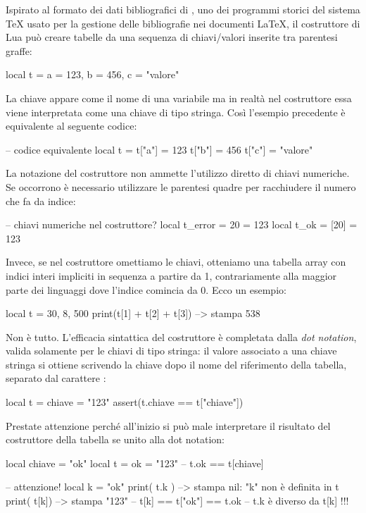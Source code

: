 Ispirato al formato dei dati bibliografici di \BibTeX, uno dei programmi storici
del sistema \TeX{} usato per la gestione delle bibliografie nei documenti
\LaTeX, il costruttore di Lua può creare tabelle da una sequenza di
chiavi/valori inserite tra parentesi graffe:
\begin{lines}
local t = { a = 123, b = 456, c = "valore" }
\end{lines}

La chiave appare come il nome di una variabile ma in realtà nel costruttore
essa viene interpretata come una chiave di tipo stringa. Così l'esempio
precedente è equivalente al seguente codice:
\begin{lines}
-- codice equivalente
local t = {}
t["a"] = 123
t["b"] = 456
t["c"] = "valore"
\end{lines}

La notazione del costruttore non ammette l'utilizzo diretto di chiavi
numeriche. Se occorrono è necessario utilizzare le parentesi quadre per
racchiudere il numero che fa da indice:
\begin{lines}
-- chiavi numeriche nel costruttore?
local t_error = { 20 = 123 }
local t_ok = { [20] = 123 }
\end{lines}

Invece, se nel costruttore omettiamo le chiavi, otteniamo una tabella array con
indici interi impliciti in sequenza a partire da 1, contrariamente alla maggior
parte dei linguaggi dove l'indice comincia da 0. Ecco un esempio:
\begin{lines}
local t = { 30, 8, 500 }
print(t[1] + t[2] + t[3]) --> stampa 538
\end{lines}

Non è tutto. L'efficacia sintattica del costruttore è completata dalla \emph{dot
notation}, valida solamente per le chiavi di tipo stringa: il valore associato a
una chiave stringa si ottiene scrivendo la chiave dopo il nome del riferimento
della tabella, separato dal carattere :
\begin{lines}
local t = { chiave = "123" }
assert(t.chiave == t["chiave"])
\end{lines}

Prestate attenzione perché all'inizio si può male interpretare il risultato del
costruttore della tabella se unito alla dot notation:
\begin{lines}
local chiave = "ok"
local t = { ok = "123"} -- t.ok == t[chiave]

-- attenzione!
local k = "ok"
print( t.k ) --> stampa nil: "k" non è definita in t
print( t[k]) --> stampa "123"
-- t[k] == t["ok"] == t.ok
-- t.k è diverso da t[k] !!!
\end{lines}

